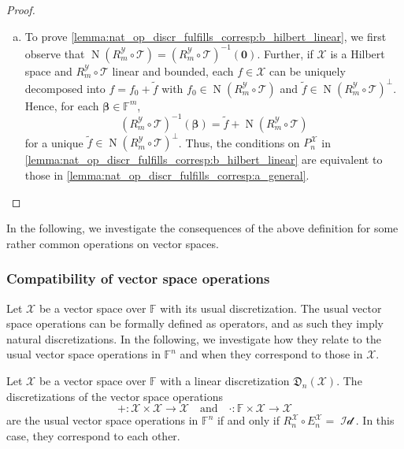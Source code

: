 \documentclass[a4paper]{paper}
\newcommand{\Discr}{\mathfrak{D}}
\newcommand{\VecSpace}[1]{\mathscr{#1}}
\newcommand{\Field}{\mathbb{F}}
\newcommand{\Op}[1]{\mathcal{#1}}
\newcommand*{\EXT}[2]{\ensuremath{E_{#1}^{#2}}}
\newcommand*{\REST}[2]{\ensuremath{R_{#1}^{#2}}}
\newcommand*{\PROJ}[2]{\ensuremath{P_{#1}^{#2}}}
\newcommand*{\RnX}{\ensuremath{\REST{n}{\VecSpace{X}}}}
\newcommand*{\RmY}{\ensuremath{\REST{m}{\VecSpace{Y}}}}
\newcommand*{\EnX}{\ensuremath{\EXT{n}{\VecSpace{X}}}}
\newcommand*{\PnX}{\ensuremath{\PROJ{n}{\VecSpace{X}}}}
\DeclareMathOperator{\nullspace}{N}
\DeclareMathOperator{\Id}{Id}
\newcommand{\vzero}{\boldsymbol{0}}
\newcommand{\vbeta}{\boldsymbol{\beta}}
\begin{document}
\begin{proof}
\begin{enumerate}[a)]
  \item To prove \eqref{lemma:nat_op_discr_fulfills_corresp:b_hilbert_linear}, we first observe that 
  $\nullspace(\RmY \circ \Op{T}) = (\RmY \circ \Op{T})^{-1}({\vzero})$. Further, if $\VecSpace{X}$ is a Hilbert space and 
  $\RmY \circ \Op{T}$ linear and bounded, each $f \in \VecSpace{X}$ can be uniquely decomposed into 
  $f = f_0 + \tilde f$ with  $f_0 \in \nullspace(\RmY \circ \Op{T})$ and $\tilde f \in \nullspace(\RmY \circ \Op{T})^\perp$. Hence, for 
  each $\vbeta \in \Field^m$,
  \begin{equation*}
   (\RmY \circ \Op{T})^{-1}({\vbeta}) = \tilde f + \nullspace(\RmY \circ \Op{T})
  \end{equation*}
  for a unique $\tilde f \in \nullspace(\RmY \circ \Op{T})^\perp$. Thus, the conditions on $\PnX$ in 
  \eqref{lemma:nat_op_discr_fulfills_corresp:b_hilbert_linear} are equivalent to those in   
  \eqref{lemma:nat_op_discr_fulfills_corresp:a_general}.
  
 \end{enumerate}
\end{proof}


In the following, we investigate the consequences of the above definition for some rather common operations
on vector spaces.


\subsubsection{Compatibility of vector space operations}

Let $\VecSpace{X}$ be a vector space over $\Field$ with its usual discretization. The usual vector space operations can be formally defined 
as operators, and as such they imply natural discretizations. In the following, we investigate how they relate to the usual vector space 
operations in $\Field^n$ and when they correspond to those in $\VecSpace{X}$.

\begin{lemma}
 Let $\VecSpace{X}$ be a vector space over $\Field$ with a linear discretization $\Discr_{n}(\VecSpace{X})$. The discretizations of the 
vector space operations
 \begin{equation*}
  + \colon \VecSpace{X} \times \VecSpace{X} \to \VecSpace{X}
  \quad \text{and} \quad
  \cdot : \Field \times \VecSpace{X} \to \VecSpace{X}
 \end{equation*}
 are the usual vector space operations in $\Field^n$ if and only if $\RnX \circ \EnX = \Op{\Id}$. In this case, they correspond to each 
 other.
\end{lemma}
\end{document}

